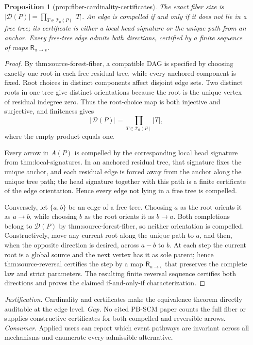 \documentclass{article}
\newtheorem{proposition}{Proposition}
\begin{document}
\begin{proposition}[prop:fiber-cardinality-certificates]\label{prop:fiber-cardinality-certificates}
The exact fiber size is \(|\mathcal D(P)|=\prod_{T\in\mathcal T_0(P)}|T|\). An edge is compelled if and only if it does not lie in a free tree; its certificate is either a local head signature or the unique path from an anchor. Every free-tree edge admits both directions, certified by a finite sequence of maps \(\mathsf R_{u\to v}\).
\end{proposition}
\begin{proof}
By thm:source-forest-fiber, a compatible DAG is specified by choosing exactly one root in each free residual tree, while every anchored component is fixed.  Root choices in distinct components affect disjoint edge sets.  Two distinct roots in one tree give distinct orientations because the root is the unique vertex of residual indegree zero.  Thus the root-choice map is both injective and surjective, and finiteness gives
\[
 |\mathcal D(P)|=\prod_{T\in\mathcal T_0(P)}|T|,
\]
where the empty product equals one.

Every arrow in \(A(P)\) is compelled by the corresponding local head signature from thm:local-signatures.  In an anchored residual tree, that signature fixes the unique anchor, and each residual edge is forced away from the anchor along the unique tree path; the head signature together with this path is a finite certificate of the edge orientation.  Hence every edge not lying in a free tree is compelled.

Conversely, let \(\{a,b\}\) be an edge of a free tree.  Choosing \(a\) as the root orients it as \(a\to b\), while choosing \(b\) as the root orients it as \(b\to a\).  Both completions belong to \(\mathcal D(P)\) by thm:source-forest-fiber, so neither orientation is compelled.  Constructively, move any current root along the unique path to \(a\), and then, when the opposite direction is desired, across \(a-b\) to \(b\).  At each step the current root is a global source and the next vertex has it as sole parent; hence thm:source-reversal certifies the step by a map \(\mathsf R_{u\to v}\) that preserves the complete law and strict parameters.  The resulting finite reversal sequence certifies both directions and proves the claimed if-and-only-if characterization.
\end{proof}
\par\smallskip\noindent \textit{Justification.} Cardinality and certificates make the equivalence theorem directly auditable at the edge level. \textit{Gap.} No cited PB-SCM paper counts the full fiber or supplies constructive certificates for both compelled and reversible arrows. \textit{Consumer.} Applied users can report which event pathways are invariant across all mechanisms and enumerate every admissible alternative.
\end{document}
